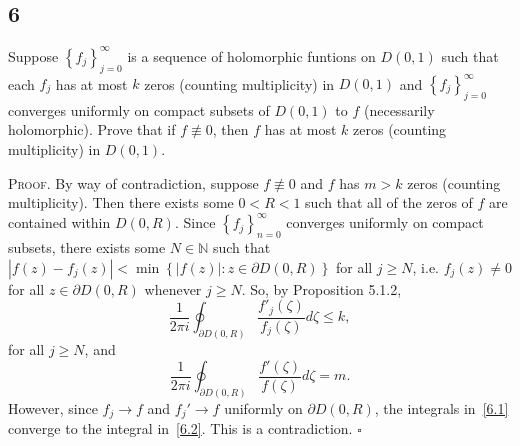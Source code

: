 \documentclass[12pt]{article}
\newcounter{ProofCounter}
\newenvironment{Proof}{\stepcounter{ProofCounter}\textsc{Proof.}}{\hfill$\square$}
\begin{document}
\subsection*{6}
\begin{tcolorbox}
  Suppose $\left\{ f_j \right\}_{j=0}^{\infty}$ is a sequence of holomorphic funtions on $D(0,1)$ such that each $f_j$ has at most $k$ zeros (counting
  multiplicity) in $D(0,1)$ and $\left\{ f_j \right\}_{j=0}^{\infty}$ converges uniformly on compact subsets of $D(0,1)$ to $f$ (necessarily
  holomorphic). Prove that if $f
  \not\equiv 0$, then $f$ has at most $k$ zeros (counting multiplicity) in $D(0,1)$.
\end{tcolorbox}
\begin{Proof}
  By way of contradiction, suppose $f \not\equiv 0$ and $f$ has $m > k$ zeros (counting multiplicity). Then there exists some $0 < R < 1$ such that
  all of the zeros of $f$ are contained within $D(0,R)$. Since $\left\{ f_j \right\}_{n=0}^{\infty}$ converges uniformly on compact subsets, there
  exists some $N \in \mathbb{N}$ such that $|f(z) - f_j(z)| < \min\left\{ |f(z)| : z \in \partial D(0,R) \right\}$ for all $j \geq N$, i.e. $f_j(z) \neq
  0$ for all $z \in \partial D(0,R)$ whenever $j \geq N$. So, by Proposition 5.1.2,
  \begin{equation}
    \frac{1}{2\pi i}\oint_{\partial D(0,R)}\frac{f'_j(\zeta)}{f_j(\zeta)}d\zeta \leq k,
    \label{6.1}
  \end{equation}
  for all $j \geq N$, and 
  \begin{equation}
    \frac{1}{2\pi i}\oint_{\partial D(0,R)}\frac{f'(\zeta)}{f(\zeta)}d\zeta = m.
    \label{6.2}
  \end{equation}
  However, since $f_j \rightarrow f$ and $f_j' \rightarrow f$ uniformly on $\partial D(0,R)$, the integrals in~\eqref{6.1} converge to the integral 
  in~\eqref{6.2}. This is a contradiction.
\end{Proof}
\end{document}
